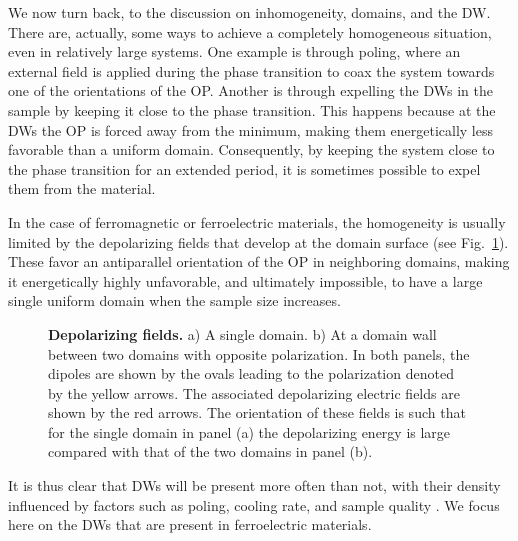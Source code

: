 We now turn back, to the discussion on inhomogeneity, domains, and the \gls{DW}.
There are, actually, some ways to achieve a completely homogeneous situation, even in relatively large systems.
One example is through poling, where an external field is applied during the phase transition to coax the system towards one of the orientations of the \gls{OP}.
Another is through expelling the \glspl{DW} in the sample by keeping it close to the phase transition.
This happens because at the \glspl{DW} the \gls{OP} is forced away from the minimum, making them energetically less favorable than a uniform domain.
Consequently, by keeping the system close to the phase transition for an extended period, it is sometimes possible to expel them from the material.

In the case of ferromagnetic or ferroelectric materials, the homogeneity is usually limited by the depolarizing fields that develop at the domain surface (see Fig.~\ref{fig:BTO_depolarizing_schematic}).
These favor an antiparallel orientation of the \gls{OP} in neighboring domains, making it energetically highly unfavorable, and ultimately impossible, to have a large single uniform domain when the sample size increases.
\begin{figure}[h]
	\caption{\label{fig:BTO_depolarizing_schematic}{\bf Depolarizing fields.} a) A single domain. b) At a domain wall between two domains with opposite polarization. In both panels, the dipoles are shown by the ovals leading to the polarization denoted by the yellow arrows. The associated depolarizing electric fields are shown by the red arrows. The orientation of these fields is such that for the single domain in panel (a) the depolarizing energy is large compared with that of the two domains in panel (b).}    
\end{figure}

It is thus clear that \glspl{DW} will be present more often than not, with their density influenced by factors such as poling, cooling rate, and sample quality \cite{Griffin2012,Shen2018,Nataf2020}.
We focus here on the \glspl{DW} that are present in ferroelectric materials.

